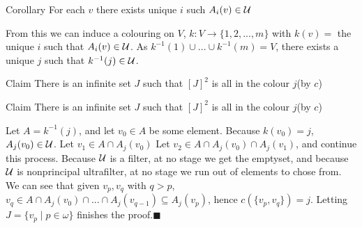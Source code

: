 	\begin{frame}
		\begin{block}{Corollary}
			For each $v$ there exists unique $i$ such $A_i(v)\in\mathcal{U}$
		\end{block}
		From this we can induce a colouring on $V$, $k:V\to\{1,2,...,m\}$ with $k(v)=$ the unique $i$ such that $A_i(v)\in\mathcal{U}$.\pause\newline
		As $k^{-1}(1)\cup...\cup k^{-1}(m)=V$, there exists a unique $j$ such that $k^{-1}(j)\in \mathcal{U}$.\pause
		\begin{block}{Claim}
			There is an infinite set $J$ such that $[J]^2$ is all in the colour $j$(by $c$)
		\end{block}
	\end{frame}
	\begin{frame}
		\begin{block}{Claim}
			There is an infinite set $J$ such that $[J]^2$ is all in the colour $j$(by $c$)
		\end{block}
		Let $A=k^{-1}(j)$, and let $v_0\in A$ be some element.\pause\newline 
		Because $k(v_0)=j$, $A_j(v_0)\in\mathcal{U}$.\pause\newline
		Let $v_1\in A\cap A_j(v_0)$\pause\newline
		Let $v_2\in A\cap A_j(v_0)\cap A_j(v_1)$, and continue this process.\pause\newline
		Because $\mathcal{U}$ is a filter, at no stage we get the emptyset, and because $\mathcal{U}$ is nonprincipal ultrafilter, at no stage we run out of elements to chose from.\pause\newline
		We can see that given $v_p, v_q$ with $q>p$, $v_q\in A\cap A_j(v_0)\cap...\cap A_j(v_{q-1})\subseteq A_j(v_p)$, hence $c(\{v_p,v_q\})=j$.\pause\newline
		Letting $J=\{v_p\mid p\in\omega\}$ finishes the proof.\hfill$\blacksquare$
	\end{frame}
